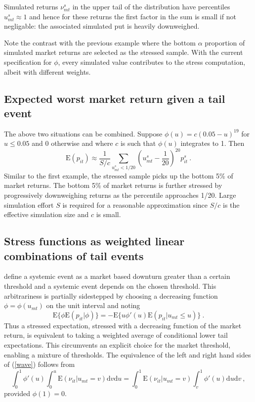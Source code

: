 \documentclass[authoryear]{elsarticle}
\newcommand{\E}{\mathrm{E}}
\newcommand{\de}{\mathrm{d}}
\newcommand{\eref}[1]{(\ref{#1})}
\newcommand{\be}[1]{\begin{equation}\label{#1}}
\newcommand{\ee}{\end{equation}}
\begin{document}
Simulated returns $\nu^s_{mt}$ in the upper tail of the distribution  have percentiles $u^s_{mt}\approx 1$ and hence for these returns the first factor in the sum is  small if not negligable: the associated simulated put  is heavily downweighed.

Note the contrast with the previous example where the bottom $\alpha$ proportion of simulated market returns are selected as the stressed sample. With the current specification for $\phi$,   every simulated value contributes to the stress computation, albeit with  different weights.


\subsection{Expected worst market return given a tail event}

The above two situations can be combined.   Suppose  $\phi(u)=c(0.05-u)^{19}$ for $u\le 0.05$ and 0 otherwise and where $c$ is such that $\phi(u)$ integrates to 1.  Then
$$
\E(p_{it}) \approx \frac{1}{S/c}\sum_{u^s_{mt}<1/20}  \left(u^s_{mt}-\frac{1}{20}\right)^{20}p_{it}^s\ .
$$
 Similar to the first example, the stressed sample picks up the bottom 5\% of market returns. The bottom 5\% of market returns is further stressed by  progressively downweighing returns as the percentile approaches 1/20.   Large simulation effort $S$ is required for a reasonable approximation since $S/c$ is the effective simulation size and $c$ is small.
 
 \subsection{Stress functions as  weighted linear combinations of tail events}

\cite{brownlees2015} define a systemic event as a market based downturn greater than a certain threshold and a systemic event  depends on the chosen threshold.   This arbitrariness is partially sidestepped by choosing a decreasing function $\phi=\phi(u_{mt})$ on the unit interval and noting 
\be{wave}
\E\{\phi\E(p_{it}|\phi)\} = -\E\{u\phi'(u)\E(p_{it}|u_{mt}\le u)\}\ .
\ee
Thus a stressed expectation, stressed with a decreasing function of the market return, is equivalent to taking a weighted average of conditional lower tail expectations.  This circumvents an explicit choice for the market threshold, enabling a mixture of thresholds.  The equivalence of the left and right hand sides of \eref{wave}  follows from 
$$
\int_0^1 \phi'(u)  \int_0^u \E(\nu_{it}|u_{mt}=v)\de v   \de u =\int_0^1\E(\nu_{it}|u_{mt}=v)\int_v^1  \phi'(u) \de u \de v\ ,   
$$
provided $\phi(1)=0$.
\end{document}
